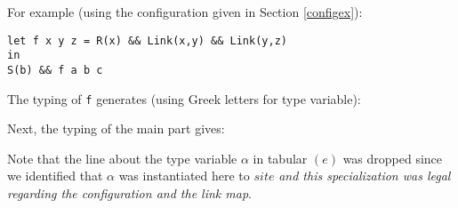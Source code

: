 \documentclass[10pt,a4paper]{article}
\newcommand{\ocaml}{\texttt}
\begin{document}
For example (using the configuration given in Section \ref{configex}):
\begin{verbatim}
let f x y z = R(x) && Link(x,y) && Link(y,z)
in
S(b) && f a b c
\end{verbatim}
The typing of \ocaml{f} generates (using Greek letters for type variable):\\

\begin{figure}[H]
  \centering
  \quad\quad
\end{figure}

Next, the typing of the main part gives:
\begin{figure}[H]
  \centering
  \quad\quad
  \quad\quad
\end{figure}

Note that the line about the type variable $\alpha$ in tabular $(e)$ was dropped since we identified that $\alpha$ was instantiated here to $site$ \emph{and this specialization was legal regarding the configuration and the link map}.
\end{document}
